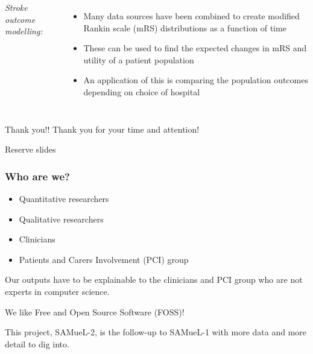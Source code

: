 \documentclass[xcolor={usenames,dvipsnames}]{beamer}
\begin{document}
\begin{frame}
\begin{columns}
    \emph{Stroke outcome modelling:}
    \begin{itemize}
        \footnotesize
        \item Many data sources have been combined to create modified Rankin scale (mRS) distributions as a function of time
        \item These can be used to find the expected changes in mRS and utility of a patient population
        \item An application of this is comparing the population outcomes depending on choice of hospital 
    \end{itemize}
\end{columns}

\end{frame}


\begin{frame}{Thank you!!}
    Thank you for your time and attention!
\end{frame}




\begin{frame}{Reserve slides}
    
\end{frame}





\begin{frame}
\frametitle{Who are we?}

\begin{itemize}
    \item Quantitative researchers 
    \item Qualitative researchers 
    \item Clinicians 
    \item Patients and Carers Involvement (PCI) group 
\end{itemize}

\vspace{1em}
Our outputs have to be explainable to the clinicians and PCI group who are not experts in computer science. 

\vspace{1em}
We like Free and Open Source Software (FOSS)! 

\vspace{1em}
This project, SAMueL-2, is the follow-up to SAMueL-1 with
more data and more detail to dig into. 

\end{frame}
\end{document}
